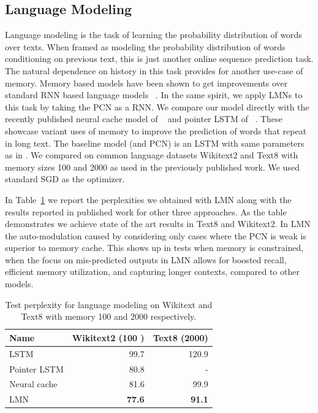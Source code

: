 \documentclass[letterpaper]{article} %
\begin{document}
\subsection{Language Modeling}
Language modeling is the task of learning the probability distribution of words over texts. When framed as modeling the probability distribution of words conditioning on previous text, this is just another online sequence prediction task. The natural dependence on history in this task provides for another use-case of memory. Memory based models have been shown to get improvements over standard RNN based language models ~\cite{SukhbaatarSWF15,merity2016pointer,grave2016improving}.
In the same spirit, we apply LMNs to this task by taking the PCN as a RNN.  We compare our model directly with the recently published neural cache model of ~\cite{grave2016improving} and pointer LSTM of ~\cite{merity2016pointer}. These showcase variant uses of memory to improve the prediction of words that repeat in long text.  The baseline model (and PCN) is an LSTM with same parameters as in \cite{grave2016improving}.
We compared on common language datasets Wikitext2 and Text8 with memory sizes 100 and 2000 as used in the previously published work. We used standard SGD as the optimizer.

In Table~\ref{tab-lm} we report the perplexities we obtained with LMN along with the results reported in published work for other three approaches. As the table demonstrates we achieve state of the art results in Text8 and Wikitext2. In LMN the auto-modulation caused by considering only cases where the PCN is weak is superior to memory cache. This shows up in tests when memory is constrained, when the focus on mis-predicted outputs in LMN allows for boosted recall, efficient memory utilization, and capturing longer contexts, compared to other models.

\begin{table}
\begin{center}
\begin{tabular}{|l|r|r|} \hline
Name &    Wikitext2 (100 ) &  Text8 (2000)\\ \hline
LSTM & 99.7 & 120.9 \\
Pointer LSTM &	80.8	& -\\
Neural cache &  81.6 &  99.9\\
LMN &	\textbf{77.6}	& \textbf{91.1}\\ \hline
\end{tabular}
\end{center}
\caption{ \label{tab-lm} Test perplexity for language modeling on Wikitext and Text8 with memory 100 and 2000 respectively.}
\end{table}
\end{document}
